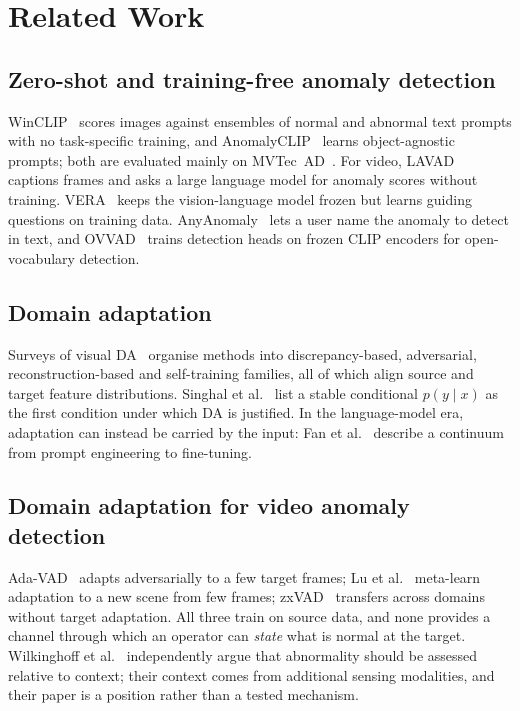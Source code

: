 \documentclass[conference]{IEEEtran}
\begin{document}
\section{Related Work}

\subsection{Zero-shot and training-free anomaly detection}
WinCLIP~\cite{jeong2023winclip} scores images against ensembles of normal and
abnormal text prompts with no task-specific training, and
AnomalyCLIP~\cite{zhou2024anomalyclip} learns object-agnostic prompts; both are
evaluated mainly on MVTec~AD~\cite{bergmann2019mvtec}. For video,
LAVAD~\cite{zanella2024lavad} captions frames and asks a large language model
for anomaly scores without training. VERA~\cite{ye2025vera} keeps the
vision-language model frozen but learns guiding questions on training data.
AnyAnomaly~\cite{anyanomaly2025} lets a user name the anomaly to detect in text,
and OVVAD~\cite{wu2024ovvad} trains detection heads on frozen CLIP encoders for
open-vocabulary detection.

\subsection{Domain adaptation}
Surveys of visual DA~\cite{patel2015visual, wang2018deep, wilson2020survey,
liu2022deep, singhal2023domain} organise methods into discrepancy-based,
adversarial, reconstruction-based and self-training families, all of which
align source and target feature distributions. Singhal et
al.~\cite{singhal2023domain} list a stable conditional $p(y\mid x)$ as the
first condition under which DA is justified. In the language-model era,
adaptation can instead be carried by the input: Fan et al.~\cite{fan2026llm}
describe a continuum from prompt engineering to fine-tuning.

\subsection{Domain adaptation for video anomaly detection}
Ada-VAD~\cite{adavad2024} adapts adversarially to a few target frames; Lu et
al.~\cite{lu2020fewshot} meta-learn adaptation to a new scene from few frames;
zxVAD~\cite{aich2023zxvad} transfers across domains without target adaptation.
All three train on source data, and none provides a channel through which an
operator can \emph{state} what is normal at the target. Wilkinghoff et
al.~\cite{wilkinghoff2026context} independently argue that abnormality should be
assessed relative to context; their context comes from additional sensing
modalities, and their paper is a position rather than a tested mechanism.
\end{document}
